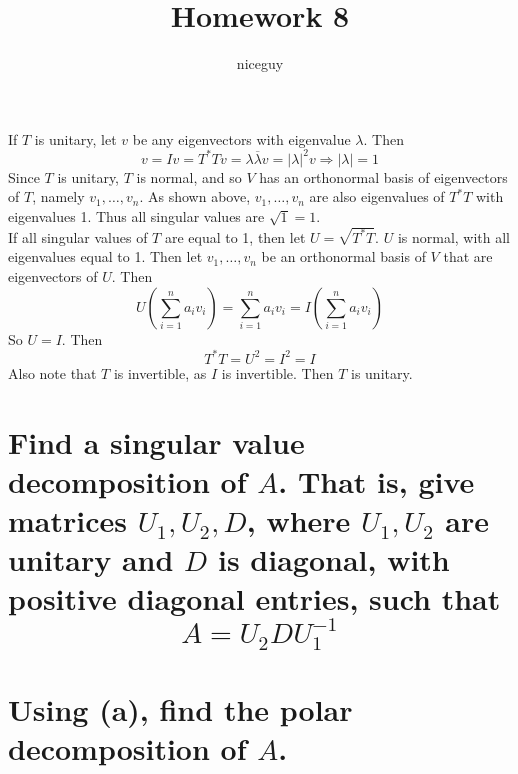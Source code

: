 \documentclass[answers]{exam}
\author{niceguy}
\title{Homework 8}
\begin{document}
\maketitle

\begin{questions}


\begin{solution}
	If $T$ is unitary, let $v$ be any eigenvectors with eigenvalue $\lambda$. Then
	$$v = Iv = T^*Tv = \lambda\overline{\lambda}v = |\lambda|^2v \Rightarrow |\lambda| = 1$$
	Since $T$ is unitary, $T$ is normal, and so $V$ has an orthonormal basis of eigenvectors of $T$, namely $v_1,\dots,v_n$. As shown above, $v_1,\dots,v_n$ are also eigenvalues of $T^*T$ with eigenvalues 1. Thus all singular values are $\sqrt{1} = 1$. \\
	If all singular values of $T$ are equal to 1, then let $U = \sqrt{T^*T}$. $U$ is normal, with all eigenvalues equal to 1. Then let $v_1,\dots,v_n$ be an orthonormal basis of $V$ that are eigenvectors of $U$. Then
	$$U\left(\sum_{i=1}^n a_iv_i\right) = \sum_{i=1}^n a_iv_i = I\left(\sum_{i=1}^n a_iv_i\right)$$
	So $U=I$. Then
	$$T^*T = U^2 = I^2 = I$$
	Also note that $T$ is invertible, as $I$ is invertible. Then $T$ is unitary.
\end{solution}


\begin{parts}
	\part{Find a singular value decomposition of $A$. That is, give matrices $U_1,U_2,D$, where $U_1,U_2$ are unitary and $D$ is diagonal, with positive diagonal entries, such that
		$$A = U_2DU_1^{-1}$$
	}
	\part{Using (a), find the polar decomposition of $A$.}
\end{parts}


\end{questions}
\end{document}

